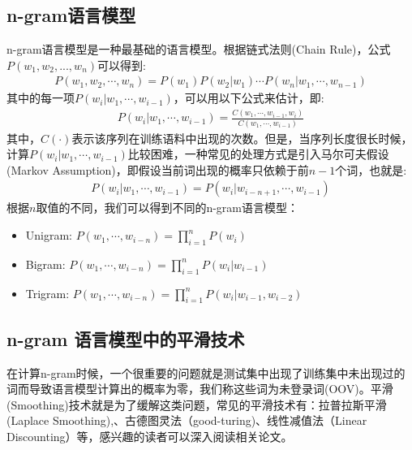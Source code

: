 \subsection{n-gram语言模型}
n-gram语言模型是一种最基础的语言模型。根据链式法则(Chain Rule)，公式$P(w_1, w_2, ..., w_n)$可以得到:
\begin{equation} \nonumber
\label{equ:ab}
\begin{aligned}
P(w_1, w_2, \cdots, w_n)=P(w_1)P(w_2|w_1)\cdots P(w_n|w_1,\cdots,w_{n-1})
\end{aligned}
\end{equation}
其中的每一项$P(w_i|w_1,\cdots,w_{i-1})$，可以用以下公式来估计，即:
\begin{equation} \nonumber
\label{equ:ab}
\begin{aligned}
P(w_i|w_1,\cdots,w_{i-1}) = \frac{C(w_1,\cdots, w_{i-1}, w_i) }{C(w_1,\cdots,w_{i-1})}
\end{aligned}
\end{equation}
其中，$C(\cdot)$表示该序列在训练语料中出现的次数。但是，当序列长度很长时候，计算$P(w_i|w_1,\cdots,w_{i-1})$比较困难，一种常见的处理方式是引入马尔可夫假设(Markov Assumption)，即假设当前词出现的概率只依赖于前$n-1$个词，也就是:
\begin{equation} \nonumber
\label{equ:ab}
\begin{aligned}
P(w_i|w_1,\cdots,w_{i-1}) = P(w_i|w_{i-n+1},\cdots,w_{i-1})
\end{aligned}
\end{equation}
根据$n$取值的不同，我们可以得到不同的n-gram语言模型：
\begin{itemize}
    \item Unigram: $P(w_1, \cdots, w_{i-n})=\prod_{i=1}^{n} P(w_i)$
	\item Bigram: $P(w_1, \cdots, w_{i-n})=\prod_{i=1}^{n} P(w_i|w_{i-1})$
	\item Trigram: $P(w_1, \cdots, w_{i-n})=\prod_{i=1}^{n} P(w_i|w_{i-1},w_{i-2})$
\end{itemize}

\subsection{n-gram 语言模型中的平滑技术}
在计算n-gram时候，一个很重要的问题就是测试集中出现了训练集中未出现过的词而导致语言模型计算出的概率为零，我们称这些词为未登录词(OOV)。平滑(Smoothing)技术就是为了缓解这类问题，常见的平滑技术有：拉普拉斯平滑(Laplace Smoothing),、古德图灵法（good-turing)、线性减值法（Linear Discounting）等，感兴趣的读者可以深入阅读相关论文。

